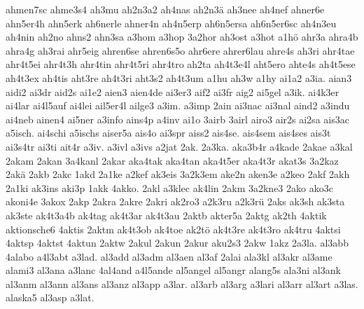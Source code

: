{    ahmen7sc
    ahme3s4
    ah3mu
    ah2n3a2
    ah4nas
    ah2n3ä
    ah3nee
    ah4nef
    ahner6e
    ahn5er4h
    ahn5erk
    ah6nerle
    ahner4n
    ah4n5erp
    ah6n5ersa
    ah6n5er6sc
    ah4n3eu
    ah4nin
    ah2no
    ahns2
    ahn3sa
    a3hom
    a3hop
    3a2hor
    ah3ost
    a3hot
    a1hö
    ahr3a
    ahra4b
    ahra4g
    ah3rai
    ahr5eig
    ahren6se
    ahren6s5o
    ahr6ere
    ahrer6lau
    ahre4s
    ah3ri
    ahr4tae
    ahr4t5ei
    ahr4t3h
    ahr4tin
    ahr4t5ri
    ahr4tro
    ah2ta
    ah4t3e4l
    aht5ero
    ahte4s
    ah4t5ese
    ah4t3ex
    ah4tis
    aht3re
    ah4t3ri
    aht3s2
    ah4t3um
    a1hu
    ah3w
    a1hy
    ai1a2
    a3ia.
    aian3
    aidi2
    ai3dr
    aid2s
    ai1e2
    aien3
    aien4de
    ai3er3
    aif2
    ai3fr
    aig2
    ai5gel
    a3ik.
    ai4k3er
    ai4lar
    ai4l5auf
    ai4lei
    ail5er4l
    ailge3
    a3im.
    a3imp
    2ain
    ai3nac
    ai3nal
    aind2
    a3indu
    ai4neb
    ainen4
    ai5ner
    a3info
    ains4p
    a4inv
    ai1o
    3airb
    3airl
    airo3
    air2s
    ai2sa
    ais3ac
    a5isch.
    ai4schi
    a5ischs
    aiser5a
    ais4o
    ai3spr
    aiss2
    ais4se.
    ais4sem
    ais4ses
    ais3t
    ai3s4tr
    ai3ti
    ait4r
    a3iv.
    a3ivl
    a3ivs
    a2jat
    2ak.
    2a3ka.
    aka3b4r
    a4kade
    2akae
    a3kal
    2akam
    2akan
    3a4kanl
    2akar
    aka4tak
    aka4tan
    aka4t5er
    aka4t3r
    akat3s
    3a2kaz
    2akä
    2akb
    2akc
    1akd
    2a1ke
    a2kef
    ak3eis
    3a2k3em
    ake2n
    aken3e
    a2keo
    2akf
    2akh
    2a1ki
    ak3ins
    aki3p
    1akk
    4akko.
    2akl
    a3klec
    ak4lin
    2akm
    3a2kne3
    2ako
    ako3c
    akoni4e
    3akox
    2akp
    2akra
    2akre
    2akri
    ak2ro3
    a2k3ru
    a2k3rü
    2aks
    ak3sh
    ak3sta
    ak3ste
    ak4t3a4b
    ak4tag
    ak4t3ar
    ak4t3au
    2aktb
    akter5a
    2aktg
    ak2th
    4aktik
    aktionsche6
    4aktis
    2aktm
    ak4t3ob
    ak4toe
    ak2tö
    ak4t3re
    ak4t3ro
    ak4tru
    4aktsi
    4aktsp
    4aktst
    4aktun
    2aktw
    2akul
    2akun
    2akur
    aku2s3
    2akw
    1akz
    2a3la.
    al3abb
    4alabo
    a4l3abt
    a3lad.
    al3add
    al3adm
    al3aen
    al3af
    2alai
    ala3kl
    al3akr
    al3ame
    alami3
    al3ana
    a3lanc
    4al4and
    a4l5ande
    al5angel
    al5angr
    alang5s
    ala3ni
    al3ank
    al3anm
    al3ann
    al3ans
    al3anz
    al3app
    a3lar.
    al3arb
    al3arg
    a3lari
    al3arr
    al3art
    a3las.
    alaska5
    al3asp
    a3lat.
}
